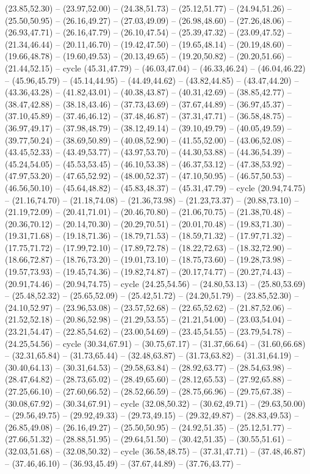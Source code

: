 {(23.85,52.30) -- (23.97,52.00) -- (24.38,51.73) -- (25.12,51.77) -- (24.94,51.26) -- (25.50,50.95) -- (26.16,49.27) -- (27.03,49.09) -- (26.98,48.60) -- (27.26,48.06) -- (26.93,47.71) -- (26.16,47.79) -- (26.10,47.54) -- (25.39,47.32) -- (23.09,47.52) -- (21.34,46.44) -- (20.11,46.70) -- (19.42,47.50) -- (19.65,48.14) -- (20.19,48.60) -- (19.66,48.78) -- (19.60,49.53) -- (20.13,49.65) -- (19.20,50.82) -- (20.20,51.66) -- (21.44,52.15) -- cycle (45.31,47.79) -- (46.03,47.04) -- (46.33,46.24) -- (46.04,46.22) -- (45.96,45.79) -- (45.14,44.95) -- (44.49,44.62) -- (43.82,44.85) -- (43.47,44.20) -- (43.36,43.28) -- (41.82,43.01) -- (40.38,43.87) -- (40.31,42.69) -- (38.85,42.77) -- (38.47,42.88) -- (38.18,43.46) -- (37.73,43.69) -- (37.67,44.89) -- (36.97,45.37) -- (37.10,45.89) -- (37.46,46.12) -- (37.48,46.87) -- (37.31,47.71) -- (36.58,48.75) -- (36.97,49.17) -- (37.98,48.79) -- (38.12,49.14) -- (39.10,49.79) -- (40.05,49.59) -- (39.77,50.24) -- (38.69,50.89) -- (40.08,52.90) -- (41.55,52.00) -- (43.06,52.08) -- (43.45,52.33) -- (43.49,53.77) -- (43.97,53.70) -- (44.30,53.88) -- (44.36,54.39) -- (45.24,54.05) -- (45.53,53.45) -- (46.10,53.38) -- (46.37,53.12) -- (47.38,53.92) -- (47.97,53.20) -- (47.65,52.92) -- (48.00,52.37) -- (47.10,50.95) -- (46.57,50.53) -- (46.56,50.10) -- (45.64,48.82) -- (45.83,48.37) -- (45.31,47.79) -- cycle (20.94,74.75) -- (21.16,74.70) -- (21.18,74.08) -- (21.36,73.98) -- (21.23,73.37) -- (20.88,73.10) -- (21.19,72.09) -- (20.41,71.01) -- (20.46,70.80) -- (21.06,70.75) -- (21.38,70.48) -- (20.36,70.12) -- (20.14,70.30) -- (20.29,70.51) -- (20.01,70.48) -- (19.83,71.30) -- (19.31,71.68) -- (19.18,71.36) -- (18.79,71.53) -- (18.59,71.32) -- (17.97,71.32) -- (17.75,71.72) -- (17.99,72.10) -- (17.89,72.78) -- (18.22,72.63) -- (18.32,72.90) -- (18.66,72.87) -- (18.76,73.20) -- (19.01,73.10) -- (18.75,73.60) -- (19.28,73.98) -- (19.57,73.93) -- (19.45,74.36) -- (19.82,74.87) -- (20.17,74.77) -- (20.27,74.43) -- (20.91,74.46) -- (20.94,74.75) -- cycle (24.25,54.56) -- (24.80,53.13) -- (25.80,53.69) -- (25.48,52.32) -- (25.65,52.09) -- (25.42,51.72) -- (24.20,51.79) -- (23.85,52.30) -- (24.10,52.97) -- (23.96,53.08) -- (23.57,52.68) -- (22.65,52.62) -- (21.87,52.06) -- (21.52,52.18) -- (20.86,52.98) -- (21.29,53.55) -- (21.21,54.00) -- (23.03,54.04) -- (23.21,54.47) -- (22.85,54.62) -- (23.00,54.69) -- (23.45,54.55) -- (23.79,54.78) -- (24.25,54.56) -- cycle (30.34,67.91) -- (30.75,67.17) -- (31.37,66.64) -- (31.60,66.68) -- (32.31,65.84) -- (31.73,65.44) -- (32.48,63.87) -- (31.73,63.82) -- (31.31,64.19) -- (30.40,64.13) -- (30.31,64.53) -- (29.58,63.84) -- (28.92,63.77) -- (28.54,63.98) -- (28.47,64.82) -- (28.73,65.02) -- (28.49,65.60) -- (28.12,65.53) -- (27.92,65.88) -- (27.25,66.10) -- (27.60,66.52) -- (28.52,66.59) -- (28.75,66.96) -- (29.75,67.38) -- (30.08,67.92) -- (30.34,67.91) -- cycle (32.08,50.32) -- (30.62,49.71) -- (29.63,50.00) -- (29.56,49.75) -- (29.92,49.33) -- (29.73,49.15) -- (29.32,49.87) -- (28.83,49.53) -- (26.85,49.08) -- (26.16,49.27) -- (25.50,50.95) -- (24.92,51.35) -- (25.12,51.77) -- (27.66,51.32) -- (28.88,51.95) -- (29.64,51.50) -- (30.42,51.35) -- (30.55,51.61) -- (32.03,51.68) -- (32.08,50.32) -- cycle (36.58,48.75) -- (37.31,47.71) -- (37.48,46.87) -- (37.46,46.10) -- (36.93,45.49) -- (37.67,44.89) -- (37.76,43.77) -- }
